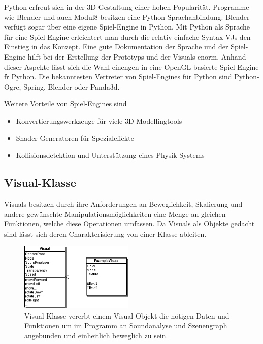 Python erfreut sich in der 3D-Gestaltung einer hohen Popularit\"at. Programme wie Blender und auch Modul8 besitzen eine 
Python-Sprachanbindung. Blender verf\"ugt sogar \"uber eine eigene Spiel-Engine in Python. Mit Python als Sprache f\"ur 
eine Spiel-Engine erleichtert man durch die relativ einfache Syntax VJs den Einstieg in das Konzept. Eine gute Dokumentation
der Sprache und der Spiel-Engine hilft bei der Erstellung der Prototyps und der Visuals enorm. Anhand dieser Aspekte
l\"asst sich die Wahl einengen in eine OpenGL-basierte Spiel-Engine f\"r Python. Die bekanntesten Vertreter von 
Spiel-Engines f\"ur Python sind Python-Ogre, Spring, Blender oder Panda3d.

Weitere Vorteile von Spiel-Engines sind 
\begin{itemize}
    \item Konvertierungswerkzeuge f\"ur viele 3D-Modellingtools
    \item Shader-Generatoren f\"ur Spezialeffekte
    \item Kollisionsdetektion und Unterst\"utzung eines Physik-Systems
\end{itemize}



\subsection{Visual-Klasse}

Visuals besitzen durch ihre Anforderungen an Beweglichkeit, Skalierung und andere gew\"unschte Manipulationsm\"oglichkeiten
eine Menge an gleichen Funktionen, welche diese Operationen umfassen. Da Visuals als Objekte gedacht sind l\"asst sich deren
Charakterisierung von einer Klasse ableiten.

\begin{figure}
    \begin{center}
        \includegraphics[width=0.48\textwidth]{pictures/visualclass1.png}
    \end{center}
    \caption{Visual-Klasse vererbt einem Visual-Objekt die n\"otigen Daten und Funktionen um im Programm an Soundanalyse
        und Szenengraph angebunden und einheitlich beweglich zu sein.}
\end{figure}

